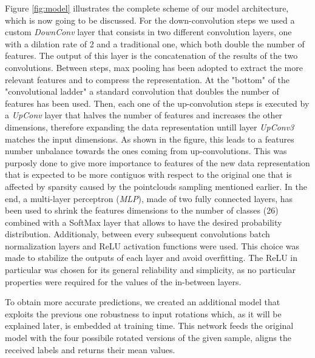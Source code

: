 Figure \ref{fig:model} illustrates the complete scheme of our model architecture, which is now going to be discussed.
For the down-convolution steps we used a custom \textit{DownConv} layer that consists in two different
convolution layers, one with a dilation rate of 2 and a traditional one, which both double the number of features. 
The output of this layer is the concatenation of the results of the two convolutions.
Between steps, max pooling has been adopted to extract the more relevant features and to compress the representation.
At the "bottom" of the "convolutional ladder" a standard convolution that doubles the number of features has been used.
Then, each one of the up-convolution steps is executed by a \textit{UpConv} layer that halves the number of features
and increases the other dimensions, therefore expanding the data representation untill layer \textit{UpConv3} matches the input dimensions.
As shown in the figure, this leads to a features number unbalance towards the ones coming from up-convolutions.
This was purposly done to give more importance to features of the new data representation that is expected to be more 
contiguos with respect to the original one that is affected by sparsity caused by the pointclouds sampling mentioned earlier.
In the end, a multi-layer perceptron (\textit{MLP}), made of two fully connected layers, has been used
to shrink the features dimensions to the number of classes (26) combined with a SoftMax layer that allows
to have the desired probability distribution.
Additionaly, between every subsequent convolutions batch normalization layers and ReLU activation functions were used.
This choice was made to stabilize the outputs of each layer and avoid overfitting. The ReLU in particular was chosen for
its general reliability and simplicity, as no particular properties were required
for the values of the in-between layers.

To obtain more accurate predictions, we created an additional model that exploits the previous
one robustness to input rotations which, as it will be explained later, is embedded at training time.
This network feeds the original model with the four possibile rotated versions of the given sample, 
aligns the received labels and returns their mean values.
